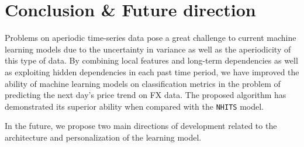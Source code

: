 \documentclass[aps,prb,groupedaddress,twocolumn,showpacs,dvipdfmx,superscriptaddress,pdftex]{revtex4-2}
\begin{document}
\section{Conclusion \& Future direction}
\label{sec.conc}


Problems on aperiodic time-series data pose a great challenge to current machine learning models due to the uncertainty in variance as well as the aperiodicity of this type of data. By combining local features and long-term dependencies as well as exploiting hidden dependencies in each past time period, we have improved the ability of machine learning models on classification metrics in the problem of predicting the next day's price trend on FX data. The proposed algorithm has demonstrated its superior ability when compared with the \verb|NHITS| model.

\vspace{2mm}


In the future, we propose two main directions of development related to the architecture and personalization of the learning model.

\vspace{2mm}

\end{document}
